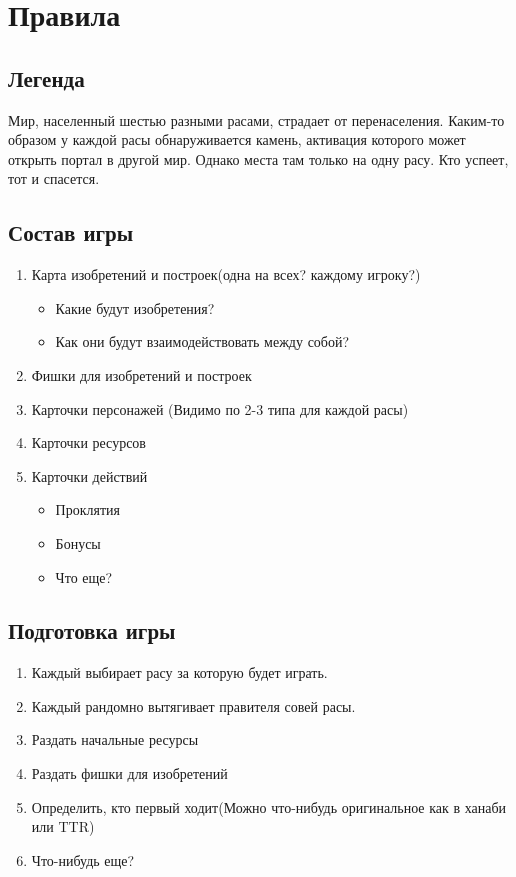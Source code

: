 \documentclass[a4paper,12pt]{article}
\begin{document}
  \section{Правила}

    \subsection{Легенда}
      Мир, населенный шестью разными расами, страдает от перенаселения. Каким-то образом у каждой расы обнаруживается камень, активация которого может открыть портал в другой мир. Однако места там только на одну расу. Кто успеет, тот и спасется.
    \subsection{Состав игры}
    	\begin{enumerate}
    	  \item Карта изобретений и построек(одна на всех? каждому игроку?)
    	    \begin{itemize}
             \item Какие будут изобретения? 
             \item Как они будут взаимодействовать между собой?
           \end{itemize}  
    	  	
	  \item Фишки для изобретений и построек
	  \item Карточки персонажей (Видимо по 2-3 типа для каждой расы)
	  \item Карточки ресурсов
	  \item Карточки действий
	    \begin{itemize}
    	      \item Проклятия
    	      \item Бонусы
    	      \item Что еще?
          \end{itemize}
	\end{enumerate}


    \subsection{Подготовка игры}
    	\begin{enumerate}
    	  \item Каждый выбирает расу за которую будет играть.
    	  \item Каждый рандомно вытягивает правителя совей расы.
    	  \item Раздать начальные ресурсы
    	  \item Раздать фишки для изобретений
    	  \item Определить, кто первый ходит(Можно что-нибудь оригинальное как в ханаби или TTR)
	  \item Что-нибудь еще?
    	\end{enumerate}
\end{document}
